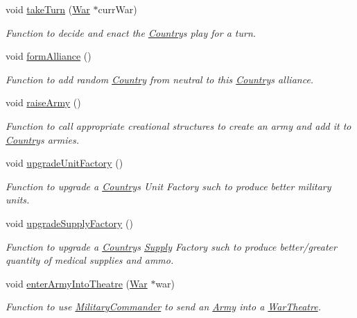 \begin{DoxyCompactItemize}
void \mbox{\hyperlink{class_country_a4d6965d1a45f1d45f5af747f8225bd40}{take\+Turn}} (\mbox{\hyperlink{class_war}{War}} $\ast$curr\+War)
\begin{DoxyCompactList}\small\item\em Function to decide and enact the \mbox{\hyperlink{class_country}{Country}}\textquotesingle{}s play for a turn. \end{DoxyCompactList}\item 
void \mbox{\hyperlink{class_country_a1ff39065671bb89e426c97efed4c80e9}{form\+Alliance}} ()
\begin{DoxyCompactList}\small\item\em Function to add random \mbox{\hyperlink{class_country}{Country}} from neutral to this \mbox{\hyperlink{class_country}{Country}}\textquotesingle{}s alliance. \end{DoxyCompactList}\item 
void \mbox{\hyperlink{class_country_a41ad154bf05464bf47c7e12d6e25a30e}{raise\+Army}} ()
\begin{DoxyCompactList}\small\item\em Function to call appropriate creational structures to create an army and add it to \mbox{\hyperlink{class_country}{Country}}\textquotesingle{}s armies. \end{DoxyCompactList}\item 
void \mbox{\hyperlink{class_country_ae1250eaf85c6269b64ceb857bff5cea6}{upgrade\+Unit\+Factory}} ()
\begin{DoxyCompactList}\small\item\em Function to upgrade a \mbox{\hyperlink{class_country}{Country}}\textquotesingle{}s Unit Factory such to produce better military units. \end{DoxyCompactList}\item 
void \mbox{\hyperlink{class_country_ac2dbba23738d7aa781066d12d8b60db1}{upgrade\+Supply\+Factory}} ()
\begin{DoxyCompactList}\small\item\em Function to upgrade a \mbox{\hyperlink{class_country}{Country}}\textquotesingle{}s \mbox{\hyperlink{class_supply}{Supply}} Factory such to produce better/greater quantity of medical supplies and ammo. \end{DoxyCompactList}\item 
void \mbox{\hyperlink{class_country_ad034f149b2f19a246dc367b05ae1dedf}{enter\+Army\+Into\+Theatre}} (\mbox{\hyperlink{class_war}{War}} $\ast$war)
\begin{DoxyCompactList}\small\item\em Function to use \mbox{\hyperlink{class_military_commander}{Military\+Commander}} to send an \mbox{\hyperlink{class_army}{Army}} into a \mbox{\hyperlink{class_war_theatre}{War\+Theatre}}. \end{DoxyCompactList}\item 

\end{DoxyCompactItemize}
